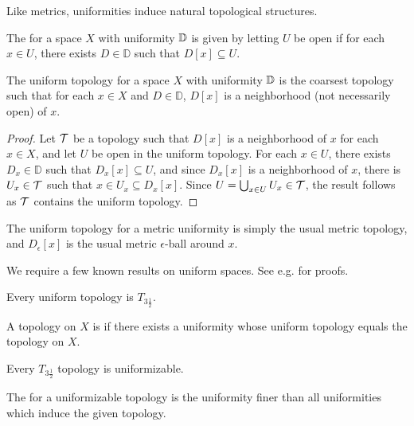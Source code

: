 Like metrics, uniformities induce natural topological structures.

\begin{defn}
  The  for a space $X$ with uniformity $\mathbb{D}$ is given
  by letting $U$ be open if for each $x\in U$, there exists $D\in\mathbb{D}$
  such that $D[x]\subseteq U$.
\end{defn}

\begin{thm}
  The uniform topology for a space $X$ with uniformity $\mathbb{D}$ is the coarsest
  topology such that for each $x\in X$ and $D\in\mathbb{D}$,
  $D[x]$ is a neighborhood (not necessarily open) of $x$.
\end{thm}

\begin{proof}
  Let $\mathcal{T}$ be a topology such that $D[x]$ is a neighborhood
  of $x$ for each $x\in X$, and let $U$ be open in the uniform topology.
  For each $x\in U$, there exists $D_x\in\mathbb{D}$ such that
  $D_x[x]\subseteq U$, and since $D_x[x]$ is a neighborhood of $x$, there
  is $U_x\in \mathcal{T}$ such that $x\in U_x\subseteq D_x[x]$. Since
  $U=\bigcup_{x\in U}U_x\in \mathcal{T}$, the result follows as $\mathcal{T}$ contains the
  uniform topology.
\end{proof}

The uniform topology
for a metric uniformity is simply the usual metric topology, and $D_\epsilon[x]$
is the usual metric $\epsilon$-ball around $x$.

We require a few known results on uniform spaces. See e.g. \cite{MR1039321}
for proofs.

\begin{thm}
  Every uniform topology is $T_{3\frac{1}{2}}$.
\end{thm}

\begin{defn}
  A topology on $X$ is  if there exists
  a uniformity whose uniform topology equals the topology on $X$.
\end{defn}

\begin{thm}
  Every $T_{3\frac{1}{2}}$ topology is uniformizable.
\end{thm}

\begin{defn}
  The  for a uniformizable topology is the uniformity
  finer than all uniformities which induce the given topology.
\end{defn}

